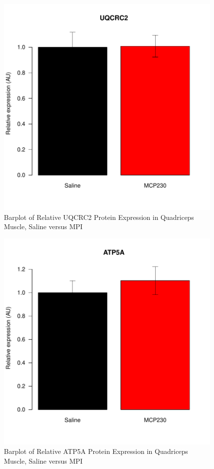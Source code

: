 \documentclass{article}
\begin{document}
\begin{figure}
\begin{center}
\includegraphics{2016-01-21_MitochondrialProteins-barplotUQCRC2}
\end{center}
\caption{Barplot of Relative UQCRC2 Protein Expression in Quadriceps Muscle, Saline versus MPI}
\label{fig:barplotUQCRC2}
\end{figure}

\begin{figure}
\begin{center}
\includegraphics{2016-01-21_MitochondrialProteins-barplotATP5A}
\end{center}
\caption{Barplot of Relative ATP5A Protein Expression in Quadriceps Muscle, Saline versus MPI}
\label{fig:barplotATP5A}
\end{figure}
\end{document}
